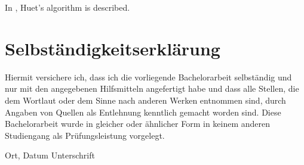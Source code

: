\documentclass[twoside,12pt,a4paper]{article}
\begin{document}
\newpage
In \cite{DBLP:books/el/RV01/Dowek01}, Huet's algorithm is described. %








\cleardoublepage

\thispagestyle{empty}
\section*{Selbständigkeitserklärung}

Hiermit versichere ich, dass ich die vorliegende Bachelorarbeit 
selbständig und nur mit den angegebenen Hilfsmitteln angefertigt habe und dass alle Stellen, die dem Wortlaut oder dem 
Sinne nach anderen Werken entnommen sind, durch Angaben von Quellen als 
Entlehnung kenntlich gemacht worden sind. 
Diese Bachelorarbeit wurde in gleicher oder ähnlicher Form in keinem anderen 
Studiengang als Prüfungsleistung vorgelegt. 

\vskip 3cm

Ort, Datum	\hfill Unterschrift \hfill 


\end{document}
